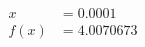 \documentclass[preview]{standalone}
\begin{document}
\begin{align*}
x &= 0.0001\\f(x) &= 4.0070673
\end{align*}
\end{document}
